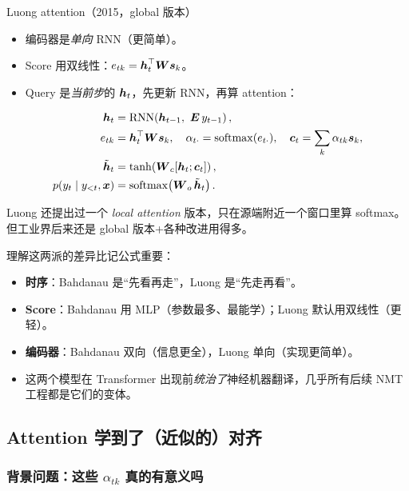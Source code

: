 \begin{mathbox}{Luong attention（2015，global 版本）}
\begin{itemize}
  \item 编码器是\emph{单向} RNN（更简单）。
  \item Score 用双线性：$e_{tk} = \boldsymbol{h}_t^{\top}\boldsymbol{W}\boldsymbol{s}_k$。
  \item Query 是\emph{当前步}的 $\boldsymbol{h}_t$，先更新 RNN，再算 attention：
\end{itemize}
\begin{align}
\boldsymbol{h}_t &= \mathrm{RNN}\!\left(\boldsymbol{h}_{t-1},\ \boldsymbol{E}\, y_{t-1}\right),\\
e_{tk} &= \boldsymbol{h}_t^{\top}\boldsymbol{W}\boldsymbol{s}_k,\quad \alpha_{t\cdot}=\mathrm{softmax}(e_{t\cdot}),\quad \boldsymbol{c}_t=\sum_k \alpha_{tk}\boldsymbol{s}_k,\\
\tilde{\boldsymbol{h}}_t &= \tanh\!\left(\boldsymbol{W}_c[\boldsymbol{h}_t;\boldsymbol{c}_t]\right),\\
p(y_t\mid y_{<t},\boldsymbol{x}) &= \mathrm{softmax}\!\left(\boldsymbol{W}_o\,\tilde{\boldsymbol{h}}_t\right).
\end{align}
\end{mathbox}

\begin{remark}
Luong 还提出过一个 \emph{local attention} 版本，只在源端附近一个窗口里算 softmax。但工业界后来还是 global 版本+各种改进用得多。
\end{remark}

\begin{engbox}
理解这两派的差异比记公式重要：
\begin{itemize}
  \item \textbf{时序}：Bahdanau 是“先看再走”，Luong 是“先走再看”。
  \item \textbf{Score}：Bahdanau 用 MLP（参数最多、最能学）；Luong 默认用双线性（更轻）。
  \item \textbf{编码器}：Bahdanau 双向（信息更全），Luong 单向（实现更简单）。
  \item 这两个模型在 Transformer 出现前\emph{统治了}神经机器翻译，几乎所有后续 NMT 工程都是它们的变体。
\end{itemize}
\end{engbox}

\subsection{Attention 学到了（近似的）对齐}
\label{sec:alignment}

\subsubsection{背景问题：这些 $\alpha_{tk}$ 真的有意义吗}


